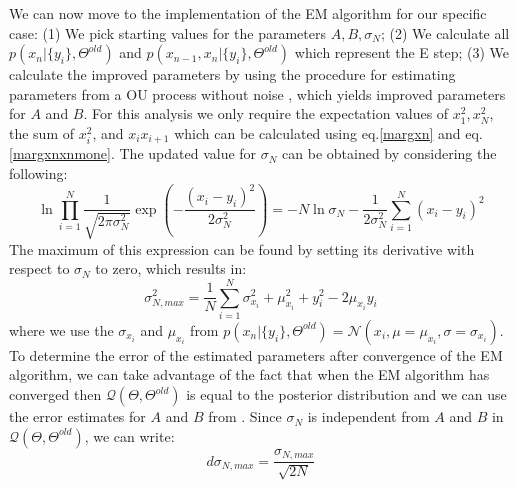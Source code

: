 \documentclass[%
 reprint,
 amsmath,amssymb,
 aps,
]{revtex4-1}
\begin{document}
We can now move to the implementation of the EM algorithm for our specific case: (1) We pick starting values for the parameters ${A,B,\sigma_N}$; (2) We calculate all $p\left( x_{n}|\{y_{i}\},\Theta^{old}\right)$ and $p\left( x_{n-1},x_{n}|\{y_{i}\},\Theta^{old}\right)$ which represent the E step; (3) We calculate the improved parameters by using the procedure for estimating parameters from a OU process without noise \cite{RN91}, which yields improved parameters for $A$ and $B$.  For this analysis we only require the expectation values of $x_{1}^{2},x_{N}^2$, the sum of $x_{i}^2$, and $x_{i}x_{i+1}$ which can be calculated using eq.\ref{margxn} and eq.\ref{margxnxnmone}.  The updated value for $\sigma_{N}$ can be obtained by considering the following:
\begin{equation}
	\ln \prod_{i=1}^{N}\frac{1}{\sqrt{2\pi\sigma_{N}^{2}}}\exp\left(-\frac{(x_{i}-y_{i})^2}{2\sigma_{N}^{2}}\right)=-N\ln\sigma_{N}-\frac{1}{2\sigma_{N}^2}\sum_{i=1}^{N}(x_{i}-y_{i})^2
\end{equation}
The maximum of this expression can be found by setting its derivative with respect to $\sigma_N$ to zero, which results in:
\begin{equation}
	\sigma_{N, max}^{2} = \frac{1}{N}\sum_{i=1}^{N}\sigma_{x_{i}}^{2}+\mu_{x_{i}}^{2}+y_{i}^{2}-2\mu_{x_{i}}y_{i}
\end{equation}
where we use the $\sigma_{x_{i}}$ and $\mu_{x_{i}}$ from $p\left( x_{n}|\{y_{i}\},\Theta^{old}\right)=\mathcal{N}(x_{i},\mu=\mu_{x_{i}},\sigma=\sigma_{x_{i}})$.\\
To determine the error of the estimated parameters after convergence of the EM algorithm, we can take advantage of the fact that when the EM algorithm has converged then $\mathcal{Q}(\Theta,\Theta^{old})$ is equal to the posterior distribution \cite{RN90} and we can use the error estimates for $A$ and $B$ from \cite{RN91}. Since $\sigma_{N}$ is independent from $A$ and $B$ in $\mathcal{Q}(\Theta,\Theta^{old})$, we can write:
\begin{equation}
	d\sigma_{N,max} = \frac{\sigma_{N, max}}{\sqrt{2N}}
\end{equation}
\end{document}

